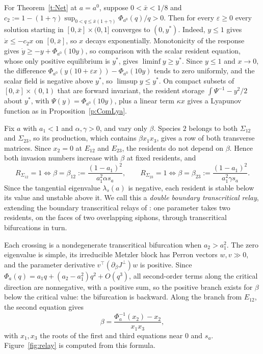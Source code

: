 For Theorem~\ref{t:Net} at $a=a^0$, suppose $0<\bar x<1/8$ and
$c_2:=1-(1+\gamma)\sup_{0<q\le\bar x(1+\gamma)}\Phi_{a^0}(q)/q>0$. Then for every $\varepsilon\ge0$ every
solution starting in $[0,\bar x]\times(0,1]$ converges to $(0,y^*)$. Indeed, $y\le1$ gives
$\dot x\le-c_2x$ on $[0,\bar x]$, so $x$ decays exponentially. Monotonicity of the response gives
$\dot y\ge-y+\Phi_{a^0}(10y)$, so comparison with the scalar resident equation, whose only positive
equilibrium is $y^*$, gives $\liminf y\ge y^*$. Since $y\le1$ and $x\to0$, the difference
$\Phi_{a^0}(y(10+\varepsilon x))-\Phi_{a^0}(10y)$ tends to zero uniformly, and the scalar field is negative
above $y^*$, so $\limsup y\le y^*$. On compact subsets of $[0,\bar x]\times(0,1)$ that are forward
invariant, the resident storage $\int\Psi^{-1}-y^2/2$ about $y^*$, with $\Psi(y)=\Phi_{a^0}(10y)$, plus a
linear term $\kappa x$ gives a Lyapunov function as in Proposition~\ref{p:ComLya}.

Fix $a$ with $a_1<1$ and $\alpha,\gamma>0$, and vary only $\beta$. Species $2$ belongs to both $\Sigma_{12}$ and
$\Sigma_{23}$, so its production, which contains $\beta x_1x_3$, gives a row of both transverse matrices. Since
$x_2=0$ at $E_{12}$ and $E_{23}$, the residents do not depend on $\beta$. Hence both invasion numbers increase
with $\beta$ at fixed residents, and
\[
 R_{\Sigma_{12}}=1\iff\beta=\beta_{12}:=\frac{(1-a_1)^2}{a_1^2\alpha s_a},\qquad
 R_{\Sigma_{23}}=1\iff\beta=\beta_{23}:=\frac{(1-a_1)^2}{a_1^2\gamma s_a}.
\]
Since the tangential eigenvalue $\lambda_s(a)$ is negative, each resident is stable below its value and unstable
above it. We call this a \emph{double boundary transcritical relay}, extending the boundary transcritical relays of
\cite{AAHrel}: one parameter takes two residents, on the faces of two overlapping siphons, through transcritical
bifurcations in turn.

Each crossing is a nondegenerate transcritical bifurcation when $a_2>a_1^2$. The zero eigenvalue is simple, its
irreducible Metzler block has Perron vectors $w,v\gg0$, and the parameter derivative
$v^\top(\partial_\beta J^\perp)w$ is positive. Since $\Phi_a(q)=a_1q+(a_2-a_1^2)q^2+O(q^3)$, all second-order
terms along the critical direction are nonnegative, with a positive sum, so the positive branch
exists for $\beta$ below the critical value: the bifurcation is backward. Along the branch from $E_{12}$, the second equation gives
\[
 \beta=\frac{\Phi_a^{-1}(x_2)-x_2}{x_1x_3},
\]
with $x_1,x_3$ the roots of the first and third equations near $0$ and $s_a$. Figure~\ref{fig:relay} is computed
from this formula.

